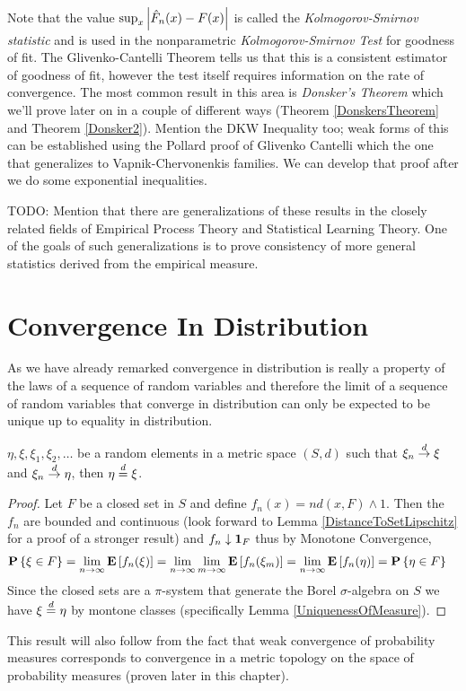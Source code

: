 Note that the value $\sup_x \left \vert \hat{F}_n(x) - F(x) \right \vert$ is called the
\emph{Kolmogorov-Smirnov statistic} and is used in the nonparametric
\emph{Kolmogorov-Smirnov Test} for goodness of fit.  The
Glivenko-Cantelli Theorem tells us that this is a consistent estimator
of goodness of fit, however the test itself requires information on
the rate of convergence.  The most common result in this area is
\emph{Donsker's Theorem} which we'll prove later on in a couple of different ways
(Theorem \ref{DonskersTheorem} and Theorem
\ref{Donsker2}).  Mention the DKW Inequality too; weak forms
of this can be established using the Pollard proof of Glivenko
Cantelli which the one that generalizes to Vapnik-Chervonenkis
families.  We can develop that proof after we do some exponential inequalities.

TODO: Mention that there are generalizations of these results in the
closely related fields of Empirical Process Theory and Statistical
Learning Theory.  One of the goals of such generalizations is to prove
consistency of more general statistics derived from the empirical measure.

\section{Convergence In Distribution}
As we have already remarked convergence in distribution is really a
property of the laws of a sequence of random variables and therefore
the limit of a sequence of random variables that converge in
distribution can only be expected to be unique up to equality in
distribution.
\begin{lem}\label{UniquenessOfConvergenceInDistribution}$\eta, \xi, \xi_1, \xi_2, \dots$ be a random elements in a
  metric space $(S,d)$ such that $\xi_n \overset{d}\to \xi$ and $\xi_n
  \overset{d}\to \eta$, then $\eta \overset{d}= \xi$.
\end{lem}
\begin{proof}
Let $F$ be a closed set in $S$ and define $f_n(x) = nd(x,F) \wedge
1$.  Then the $f_n$ are bounded and continuous (look forward to Lemma
\ref{DistanceToSetLipschitz} for a proof of a stronger result) and
$f_n \downarrow \textbf{1}_{F}$ thus by Monotone Convergence,
\begin{align*}
\textbf{P}\left \{\xi \in F \right \} &= \lim_{n \to \infty} \textbf{E}\left[f_n(\xi)\right]=
\lim_{n \to \infty} \lim_{m \to \infty} \textbf{E}\left[f_n(\xi_m)\right] =  \lim_{n \to \infty} \textbf{E}\left[f_n(\eta)\right]=\textbf{P}\left \{\eta \in F \right \} 
\end{align*}
Since the closed sets are a $\pi$-system that generate the Borel
$\sigma$-algebra on $S$ we have $\xi \overset{d}= \eta$ by montone classes
(specifically Lemma \ref{UniquenessOfMeasure}).
\end{proof}
This result will also follow from the fact that weak convergence of
probability measures corresponds to convergence in a metric topology on the space
of probability measures (proven later in this chapter).

